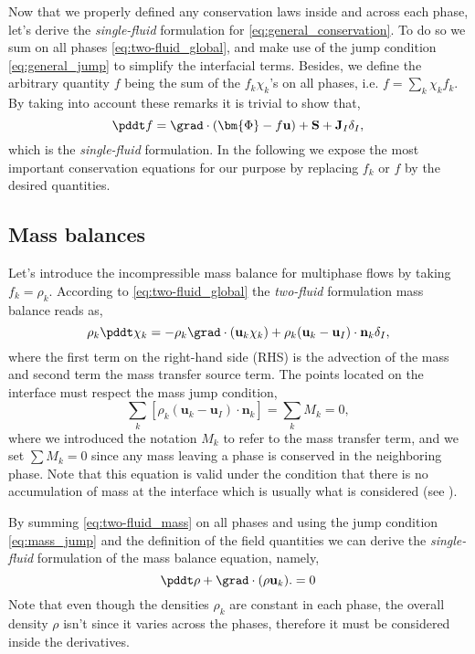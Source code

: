 Now that we properly defined any conservation laws inside and across each phase, let's derive the \textit{single-fluid} formulation for \ref{eq:general_conservation}.
To do so we sum on all phases \ref{eq:two-fluid_global}, and make use of the jump condition \ref{eq:general_jump} to simplify the interfacial terms. 
Besides, we define the arbitrary quantity $f$ being the sum of the $f_k\chi_k$'s on all phases, i.e. $f = \sum_k \chi_k f_k$.
By taking into account these remarks it is trivial to show that, 
\begin{equation}
    \pddt f
    = \grad \cdot (\bm{\Phi} - f \textbf{u})
    + \textbf{S}
    + \textbf{J}_I \delta_I,
    \label{eq:single-fluid_global}
\end{equation}
which is the \textit{single-fluid} formulation. 
In the following we expose the most important conservation equations for our purpose by replacing $f_k$ or $f$ by the desired quantities.  

\subsection{Mass balances}

Let's introduce the incompressible mass balance for multiphase flows by taking $f_k = \rho_k$. 
According to \ref{eq:two-fluid_global} the \textit{two-fluid} formulation mass balance reads as,
\begin{equation}
    \rho_k\pddt\chi_k
    = 
    - \rho_k\grad\cdot(\textbf{u}_k \chi_k)  
    + \rho_k (\textbf{u}_k-\textbf{u}_I) \cdot \textbf{n}_k \delta_I,
    \label{eq:two-fluid_mass}
\end{equation}
where the first term on the right-hand side (RHS) is the advection of the mass and second term the mass transfer source term.
The points located on the interface must respect the mass jump condition,
\begin{equation}
    \sum_k \left[
        \rho_k (\textbf{u}_k-\textbf{u}_I) \cdot \textbf{n}_k
    \right]
    =\sum_k M_k 
    = 0,
    \label{eq:mass_jump}
\end{equation}
where we introduced the notation $M_k$ to refer to the mass transfer term, and we set $\sum M_k =0$ since any mass leaving a phase is conserved in the neighboring phase.
Note that this equation is valid under the condition that there is no accumulation of mass at the 
interface which is usually what is considered (see \citet{morel2015mathematical}). 

By summing \ref{eq:two-fluid_mass} on all phases and using the jump condition \ref{eq:mass_jump} and the definition of the field quantities we can derive the \textit{single-fluid} formulation of the mass balance equation, namely,  
\begin{equation}
    \pddt \rho
    + \grad\cdot(\rho\textbf{u}_k). 
    = 0 
    \label{eq:single-fluid_mass}
\end{equation}
Note that even though the densities $\rho_k$ are constant in each phase, the overall density $\rho$ isn't since it varies across the phases, therefore it must be considered inside the derivatives.


